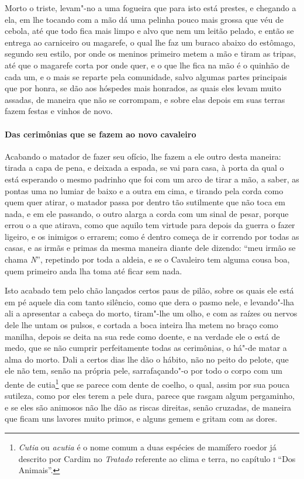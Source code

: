  Morto o triste, levam"-no a uma fogueira que para isto está prestes, e
chegando a ela, em lhe tocando com a mão dá uma pelinha pouco mais
grossa que véu de cebola, até que todo fica mais limpo e alvo que nem
um leitão pelado, e então se entrega ao carniceiro ou magarefe, o qual
lhe faz um buraco abaixo do estômago, segundo seu estilo, por onde os
meninos primeiro metem a mão e tiram as tripas, até que o magarefe
corta por onde quer, e o que lhe fica na mão é o quinhão de cada um, e
o mais se reparte pela comunidade, salvo algumas partes principais que
por honra, se dão aos hóspedes mais honrados, as quais eles levam muito
assadas, de maneira que não se corrompam, e sobre elas depois em suas
terras fazem festas e vinhos de novo. 

\paragraph{Das cerimônias que se fazem ao novo cavaleiro}

Acabando o matador de fazer seu ofício, lhe fazem a ele outro
desta maneira: tirada a capa de pena, e deixada a espada, se vai para
casa, à porta da qual o está esperando o mesmo padrinho que foi com um
arco de tirar a mão, a saber, as pontas uma no lumiar de baixo e a
outra em cima, e tirando pela corda como quem quer atirar, o matador
passa por dentro tão sutilmente que não toca em nada, e em ele
passando, o outro alarga a corda com um sinal de pesar, porque errou o
a que atirava, como que aquilo tem virtude para depois da guerra o
fazer ligeiro, e os inimigos o errarem; como é dentro começa de ir
correndo por todas as casas, e as irmãs e primas da mesma maneira
diante dele dizendo: ``meu irmão se chama \textit{N}'', repetindo por
toda a aldeia, e se o Cavaleiro tem alguma cousa boa, quem primeiro
anda lha toma até ficar sem nada. 

 Isto acabado tem pelo chão lançados certos paus de pilão, sobre os
quais ele está em pé aquele dia com tanto silêncio, como que dera o
pasmo nele, e levando"-lha ali a apresentar a cabeça do morto, tiram"-lhe
um olho, e com as raízes ou nervos dele lhe untam os pulsos, e cortada
a boca inteira lha metem no braço como manilha, depois se deita na sua
rede como doente, e na verdade ele o está de medo, que se não cumprir
perfeitamente todas as cerimônias, o há"-de matar a alma do morto. Dali
a certos dias lhe dão o hábito, não no peito do pelote, que ele não
tem, senão na própria pele, sarrafaçando"-o por todo o corpo com um
dente de cutia\footnote{ \textit{Cutia} ou \textit{acutia} é o nome
comum a duas espécies de mamífero roedor já descrito por Cardim no
\textit{Tratado} referente ao clima e terra, no capítulo \textsc{i} ``Dos
Animais''.} que se parece com dente de coelho, o qual, assim por sua
pouca sutileza, como por eles terem a pele dura, parece que rasgam
algum pergaminho, e se eles são animosos não lhe dão as riscas
direitas, senão cruzadas, de maneira que ficam uns lavores muito
primos, e alguns gemem e gritam com as dores.

